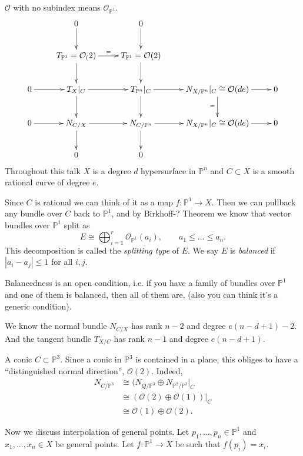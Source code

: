 \medskip\noindent

$\mathcal{O}$ with no subindex means $\mathcal{O}_{\mathbb{P}^1}$.
$$
\xymatrix{
&0\ar[d]&0\ar[d]\\
&T_{\mathbb{P}^1}=\mathcal{O}_(2)\ar[d]\ar[r]^=
&T_{\mathbb{P}^1}=\mathcal{O}(2)\ar[d]\\
0\ar[r]&T_{X}|_{C}\ar[d]\ar[r]&T_{\mathbb{P}^n}|_{C}\ar[d]\ar[r]&
N_{X/\mathbb{P}^n}|_{C}\cong \mathcal{O}(de)\ar[d]_=\ar[r]&0\\
0\ar[r]& N_{C/X}\ar[d]\ar[r]&N_{C/\mathbb{P}^n}\ar[d]\ar[r]&
N_{X/\mathbb{P}^n}|_{C}\cong \mathcal{O}(de)\ar[r]&0\\
&0&0
}
$$
Throughout this talk
$X$ is a degree $d$ hypersurface in $\mathbb{P}^n$ 
and $C \subset X$ is a smooth rational curve of degree $e$.

Since $C$ is rational we can think of it
as a map $f:\mathbb{P}^1 \to X$.
Then we can pullback any bundle over $C$ 
back to $\mathbb{P}^1$,
and by Birkhoff-? Theorem
we know that vector bundles over $\mathbb{P}^1$ 
split as
$$
E\cong \bigoplus_{i=1}^r \mathcal{O}_{\mathbb{P}^1}(a_i),
\qquad a_1\leq \ldots \leq a_n.
$$
This decomposition is called the
{\it splitting type} of $E$.
We say $E$ is {\it balanced} if
$|a_i-a_j|\leq 1$ for all $i,j$.

Balancedness is an open condition,
i.e. if you have a family of bundles over $\mathbb{P}^1$ 
and one of them is balanced, then all of them are,
(also you can think it's a generic condition).

We know the normal bundle $N_{C/X}$ has rank $n-2$
and degree  $e(n-d+1)-2$.
And the tangent bundle $T_{X/C}$ 
has rank $n-1$ and degree $e(n-d+1)$.

\begin{example}
\label{example-conic}
A conic $C \subset \mathbb{P}^3$.
Since a conic in $\mathbb{P}^3$ is contained in a plane,
this obliges to have a ``distinguished normal direction'',
$\mathcal{O}(2)$. Indeed,
\begin{align*}
N_{C/\mathbb{P}^3}&\cong(N_{Q/\mathbb{P}^3}\oplus
N_{\mathbb{P}^2/\mathbb{P}^3}|_{C}\\
&\cong(\mathcal{O}(2) \oplus \mathcal{O}(1))|_{C}\\
&\cong\mathcal{O}(1)\oplus \mathcal{O}(2).
\end{align*}
\end{example}

\medskip\noindent
Now we discuss interpolation of general points.
Let $p_1,\ldots,p_n \in \mathbb{P}^1$ 
and $x_1,\ldots, x_n \in X$ 
be general points.
Let $f:\mathbb{P}^1 \to X$ be such that
$f(p_i)=x_i$.

